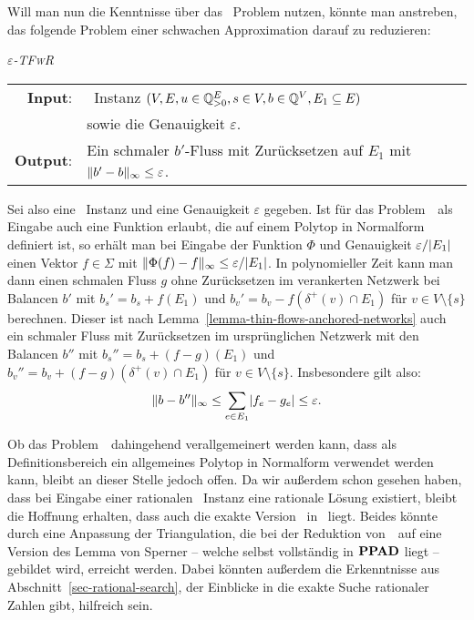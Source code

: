 Will man nun die Kenntnisse über das \Brouwer\ Problem nutzen, könnte man anstreben, das folgende Problem einer schwachen Approximation darauf zu reduzieren:

\newcommand{\epsTFwR}{\textsc{$\varepsilon$-TFwR}}
\begin{center}
	\begin{mdframed}
		\centering
		\emph{\epsTFwR} \\[1em]
		\begin{tabular}{rl}
			{\bfseries Input}: &\problemThinFlow\ Instanz $(V, E, u \in \mathbb{Q}^E_{>0}, s\in V, b\in \mathbb{Q}^V, E_1\subseteq E)$\\
				&sowie die Genauigkeit $\varepsilon$.\\
			{\bfseries Output}: &Ein schmaler $b'$-Fluss mit Zurücksetzen auf $E_1$ mit $\lVert b' - b\rVert_\infty \leq \varepsilon$.
		\end{tabular}
	\end{mdframed}
\end{center}

Sei also eine \problemThinFlow\ Instanz und eine Genauigkeit $\varepsilon$ gegeben.
Ist für das Problem~\Brouwer\ als Eingabe auch eine Funktion erlaubt, die auf einem Polytop in Normalform definiert ist, so erhält man bei Eingabe der Funktion $\Phi$ und Genauigkeit $\varepsilon/\lvert E_1\rvert$ einen Vektor $f\in\Sigma$ mit $\lVert\Phi(f) - f\rVert_\infty \leq \varepsilon / \lvert E_1\rvert$.
In polynomieller Zeit kann man dann einen schmalen Fluss $g$ ohne Zurücksetzen im verankerten Netzwerk bei Balancen $b'$ mit $b_s' = b_s + f(E_1)$ und $b_v' = b_v - f(\delta^+(v)\cap E_1)$ für $v\in V\setminus\{ s \}$ berechnen.
Dieser ist nach Lemma~\ref{lemma-thin-flows-anchored-networks} auch ein schmaler Fluss mit Zurücksetzen im ursprünglichen Netzwerk mit den Balancen $b''$ mit $b_s'' = b_s + (f-g)(E_1)$ und $b_v'' = b_v + (f-g)(\delta^+(v)\cap E_1)$ für $v\in V\setminus\{s\}$.
Insbesondere gilt also:
\[ 
	\lVert b - b''\rVert_\infty \leq \sum_{e \in E_1} \lvert f_e - g_e\rvert \leq \varepsilon.
\]

Ob das Problem~\Brouwer\ dahingehend verallgemeinert werden kann, dass als Definitionsbereich ein allgemeines Polytop in Normalform verwendet werden kann, bleibt an dieser Stelle jedoch offen.
Da wir außerdem schon gesehen haben, dass bei Eingabe einer rationalen \problemThinFlow\ Instanz eine rationale Lösung existiert, bleibt die Hoffnung erhalten, dass auch die exakte Version \probTFwR\ in \PPAD\ liegt.
Beides könnte durch eine Anpassung der Triangulation, die bei der Reduktion von~\Brouwer\ auf eine Version des Lemma von Sperner -- welche selbst vollständig in $\textbf{PPAD}$ liegt -- gebildet wird, erreicht werden.
Dabei könnten außerdem die Erkenntnisse aus Abschnitt~\ref{sec-rational-search}, der Einblicke in die exakte Suche rationaler Zahlen gibt, hilfreich sein.